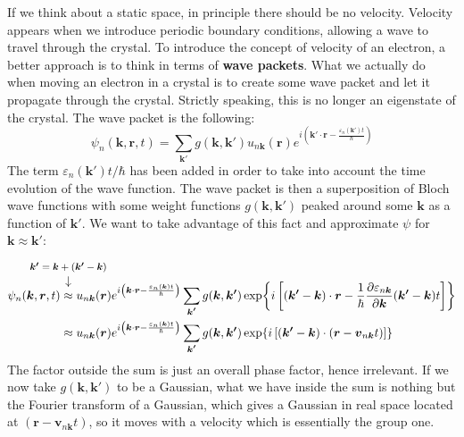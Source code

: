 \documentclass[10.75pt,a4paper,openright,bottom=2cm]{article}
\renewcommand{\Vec}[1]{\boldsymbol{#1}}
\begin{document}
If we think about a static space, in principle there should be no velocity. Velocity appears when we introduce periodic boundary conditions, allowing a wave to travel through the crystal. To introduce the concept of velocity of an electron, a better approach is to think in terms of \textbf{wave packets}. What we actually do when moving an electron in a crystal is to create some wave packet and let it propagate through the crystal. Strictly speaking, this is no longer an eigenstate of the crystal.
The wave packet is the following:
\[
\psi_n(\Vec{k},\Vec{r},t)=\sum_{\Vec{k'}}g(\Vec{k},\Vec{k'})u_{n\Vec{k}}(\Vec{r})e^{i\left(\Vec{k'}\cdot\Vec{r}-\frac{\varepsilon_n(\Vec{k'})t}{\hbar}\right)} 
\]
The term $\varepsilon_n(\Vec{k'})t/\hbar$ has been added in order to take into account the time evolution of the wave function. The wave packet is then a superposition of Bloch wave functions with some weight functions $g(\Vec{k},\Vec{k'})$ peaked around some $\Vec{k}$ as a function of $\Vec{k'}$. We want to take advantage of this fact and approximate $\psi$ for $\Vec{k}\approx\Vec{k'}$:
\begin{align*}
\psi_n(\Vec{k},\Vec{r},t)&\overset{\mathclap{\tikz \node {$\downarrow$} node [above=1ex] {\footnotesize $\Vec{k'}=\Vec{k}+(\Vec{k'}-\Vec{k})$};}}{\approx} u_{n\Vec{k}}(\Vec{r})e^{i\left(\Vec{k}\cdot\Vec{r}-\frac{\varepsilon_n(\Vec{k})t}{\hbar}\right)}\sum_{\Vec{k'}}g(\Vec{k},\Vec{k'})\exp{i\left[(\Vec{k'}-\Vec{k})\cdot\Vec{r}-\frac{1}{\hbar}\frac{\partial\varepsilon_{n\Vec{k}}}{\partial\Vec{k}}(\Vec{k'}-\Vec{k})t\right]}\\
&\approx u_{n\Vec{k}}(\Vec{r})e^{i\left(\Vec{k}\cdot\Vec{r}-\frac{\varepsilon_n(\Vec{k})t}{\hbar}\right)}\sum_{\Vec{k'}}g(\Vec{k},\Vec{k'})\exp{i\left[(\Vec{k'
}-\Vec{k})\cdot(\Vec{r}-\Vec{v}_{n\Vec{k}}t)\right]}
\end{align*}
The factor outside the sum is just an overall phase factor, hence irrelevant. If we now take $g(\Vec{k},\Vec{k'})$ to be a Gaussian, what we have inside the sum is nothing but the Fourier transform of a Gaussian, which gives a Gaussian in real space located at $(\Vec{r}-\Vec{v}_{n\Vec{k}}t)$, so it moves with a velocity which is essentially the group one.\\
\end{document}
